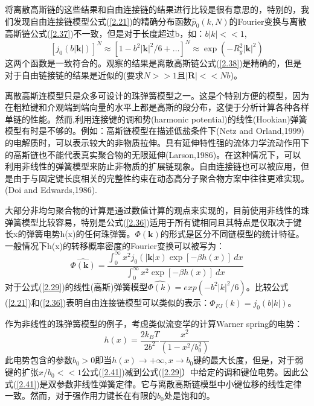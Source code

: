 将离散高斯链的这些结果和自由连接链的结果进行比较是很有意思的，特别的，我们发现自由连接链模型公式(\ref{2.21})的精确分布函数$\hat{p}_{0}(k,N)$的Fourier变换与离散高斯链公式(\ref{2.37})不一致，但是对于长度超过b，如：$b|k|<<1$,
\begin{equation}\label{2.39}
[j_{0}(b|\mathbf{k}|)]^N\approx [1-b^2|\mathbf{k}|^2/6+\dots]^N\approx \exp(-R_{g}^2|\mathbf{k}|^2)
\end{equation}
这两个函数是一致符合的。观察的结果是离散高斯链公式(\ref{2.38})是精确的，但是对于自由链接链的结果是近似的(要求$N>>1$且$|\mathbf{R}|<<Nb$)。

离散高斯连模型只是众多可设计的珠弹簧模型之一。这是个特别方便的模型，因为在粗粒键和介观端到端向量的水平上都是高斯的段分布，这便于分析计算各种各样单链的性能。然而,利用连接键的调和势(harmonic potential)的线性(Hookian)弹簧模型有时是不够的。例如：高斯链模型在描述低盐条件下(Netz and Orland,1999)的电解质时，可以表示较大的非物质拉伸。具有延伸特性强的流体力学流动作用下的高斯链也不能代表真实聚合物的无限延伸(Larson,1986)。在这种情况下，可以利用非线性的弹簧模型来防止非物质的扩展链现象。自由连接链也可以被应用，但是由于与固定键长度相关的完整性约束在动态高分子聚合物方案中往往更难实现。(Doi and Edwards,1986).

大部分非均匀聚合物的计算是通过数值计算的观点来实现的，目前使用非线性的珠弹簧模型比较容易，特别是公式(\ref{2.36})适用于所有键相同且其特点是仅取决于键长x的弹簧电势h(x)的任何珠弹簧。$\varPhi(\mathbf{k})$的形式是区分不同链模型的统计特征。一般情况下h(x)的转移概率密度的Fourier变换可以被写为：
\begin{equation}\label{2.40}
\hat{\varPhi(\mathbf{k})}=\frac{\int_{0}^{\infty}  x^2j_{0}(|\mathbf{k}|x)\exp[-\beta h(x)]~dx}{\int_{0}^{\infty}  x^2\exp[-\beta h(x)]~dx} 
\end{equation}
对于公式(\ref{2.29})的线性(高斯)弹簧模型$\hat{\varPhi(k)}=exp(-b^2|k|^2/6)$。比较公式(\ref{2.21})和(\ref{2.36})表明自由连接链模型可以类似的表示：$\hat{\varPhi_{FJ}(k)}=j_{0}(b|k|)$。

作为非线性的珠弹簧模型的例子，考虑类似流变学的计算Warner spring的电势：
\begin{equation}\label{2.41}
h(x)=\frac{2k_{B}T}{2b^2}\frac{x^2}{(1-x^2/b_{0}^2)}
\end{equation}
此电势包含的参数$b_{0}>0$即当$h(x)\to +\infty,x\to b_{0}$键的最大长度，但是，对于弱键的扩张$x/b_{0}<<1$公式(\ref{2.41})减到公式(\ref{2.29}）中给定的调和键位电势。因此公式(\ref{2.41})是双参数非线性弹簧定律。它与离散高斯链模型中小键位移的线性定律一致。然而，对于强作用力键长在有限的$b_{0}$处是饱和的。

